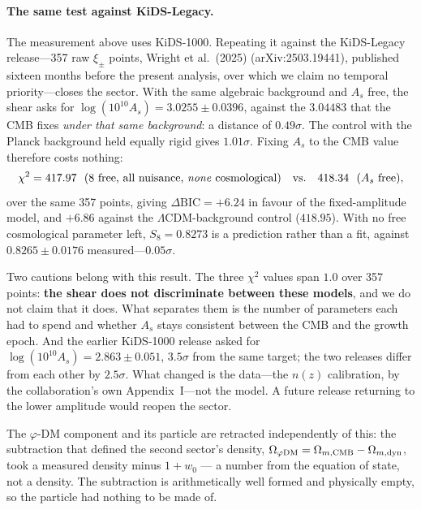 \documentclass[a4paper,11pt]{article}
\begin{document}
\paragraph{The same test against KiDS-Legacy.}
The measurement above uses KiDS-1000.  Repeating it against the KiDS-Legacy
release---357 raw $\xi_\pm$ points, Wright et al.\ (2025) (arXiv:2503.19441),
published sixteen months before the present analysis, over which we claim no
temporal priority---closes the sector.  With the same algebraic background and
$A_s$ free, the shear asks for $\log(10^{10}A_s)=3.0255\pm0.0396$, against the
$3.04483$ that the CMB fixes \emph{under that same background}: a distance of
$0.49\sigma$.  The control with the Planck background held equally rigid gives
$1.01\sigma$.  Fixing $A_s$ to the CMB value therefore costs nothing:
\begin{equation}
  \chi^2 = 417.97 \ \ (\text{8 free, all nuisance, \emph{none} cosmological})
  \quad\text{vs.}\quad
  418.34 \ \ (A_s \text{ free}),
\end{equation}
over the same 357 points, giving $\Delta\mathrm{BIC}=+6.24$ in favour of the
fixed-amplitude model, and $+6.86$ against the $\Lambda$CDM-background control
($418.95$).  With no free cosmological parameter left, $S_8=0.8273$ is a
prediction rather than a fit, against $0.8265\pm0.0176$ measured---$0.05\sigma$.

Two cautions belong with this result.  The three $\chi^2$ values span $1.0$
over 357 points: \textbf{the shear does not discriminate between these
models}, and we do not claim that it does.  What separates them is the number
of parameters each had to spend and whether $A_s$ stays consistent between the
CMB and the growth epoch.  And the earlier KiDS-1000 release asked for
$\log(10^{10}A_s)=2.863\pm0.051$, $3.5\sigma$ from the same target; the two
releases differ from each other by $2.5\sigma$.  What changed is the data---the
$n(z)$ calibration, by the collaboration's own Appendix~I---not the model.  A
future release returning to the lower amplitude would reopen the sector.

The $\varphi$-DM component and its particle are retracted independently of
this: the subtraction that defined the second sector's density,
$\Omega_{\varphi\rm DM}=\Omega_{m,\rm CMB}-\Omega_{m,\rm dyn}$, took a measured
density minus $1+w_0$ --- a number from the equation of state, not a density.
The subtraction is arithmetically well formed and physically empty, so the
particle had nothing to be made of.
\end{document}
